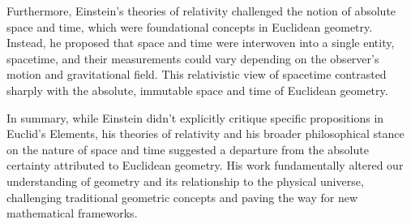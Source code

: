 Furthermore, Einstein's theories of relativity challenged the notion of absolute space and time, which were foundational concepts in Euclidean geometry. Instead, he proposed that space and time were interwoven into a single entity, spacetime, and their measurements could vary depending on the observer's motion and gravitational field. This relativistic view of spacetime contrasted sharply with the absolute, immutable space and time of Euclidean geometry.

In summary, while Einstein didn't explicitly critique specific propositions in Euclid's Elements, his theories of relativity and his broader philosophical stance on the nature of space and time suggested a departure from the absolute certainty attributed to Euclidean geometry. His work fundamentally altered our understanding of geometry and its relationship to the physical universe, challenging traditional geometric concepts and paving the way for new mathematical frameworks.

\clearpage